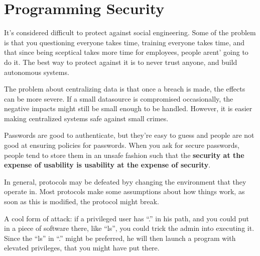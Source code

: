 \section{Programming Security}
It's considered difficult to protect against social engineering.
Some of the problem is that you questioning everyone takes time,
training everyone takes time, and that since being sceptical takes more
time for employees, people arent' going to do it. The best way
to protect against it is to never trust anyone, and build autonomous systems.

The problem about centralizing data is that once a breach is made, the effects
can be more severe. If a small datasource is compromised occasionally, the
negative impacts might still be small enough to be handled. However,
it is easier making centralized systems safe against small crimes.
\newline

Passwords are good to authenticate, but they're easy to guess and 
people are not good at ensuring policies for passwords. When you ask for
secure passwords, people tend to store them in an unsafe fashion such that
the \textbf{security at the expense of usability is usability at the expense
of security}.

In general, protocols may be defeated byy changing the environment 
that they operate in. Most protocols make some assumptions about how
things work, as soon as this is modified, the protocol might break.

A cool form of attack: if a privileged user has ``.'' in his path, and you
could put in a piece of software there, like ``ls'', you could trick the admin
into executing it. Since the ``ls'' in ``.'' might be preferred, he will then launch
a program with elevated privileges, that you might have put there.
